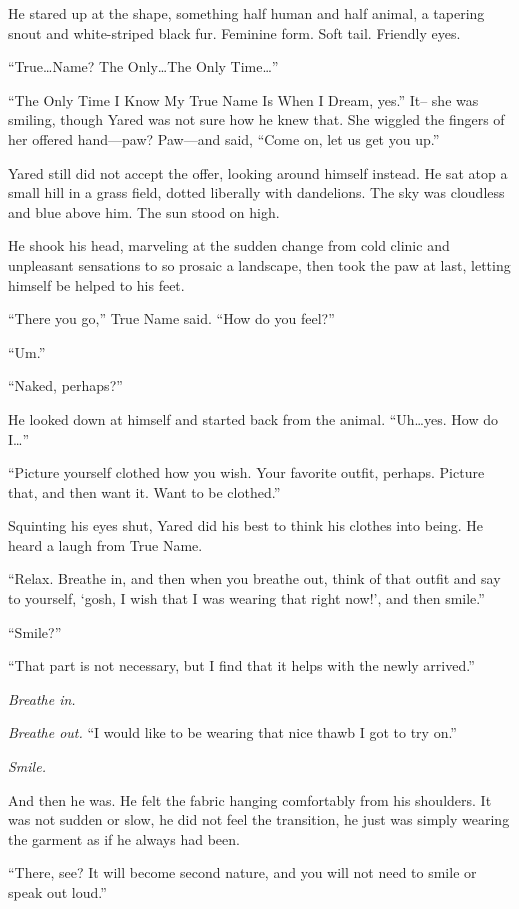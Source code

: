 He stared up at the shape, something half human and half animal, a tapering snout and white-striped black fur. Feminine form. Soft tail. Friendly eyes.

``True\ldots Name? The Only\ldots The Only Time\ldots{}''

``The Only Time I Know My True Name Is When I Dream, yes.'' It-- she was smiling, though Yared was not sure how he knew that. She wiggled the fingers of her offered hand---paw? Paw---and said, ``Come on, let us get you up.''

Yared still did not accept the offer, looking around himself instead. He sat atop a small hill in a grass field, dotted liberally with dandelions. The sky was cloudless and blue above him. The sun stood on high.

He shook his head, marveling at the sudden change from cold clinic and unpleasant sensations to so prosaic a landscape, then took the paw at last, letting himself be helped to his feet.

``There you go,'' True Name said. ``How do you feel?''

``Um.''

``Naked, perhaps?''

He looked down at himself and started back from the animal. ``Uh\ldots yes. How do I\ldots{}''

``Picture yourself clothed how you wish. Your favorite outfit, perhaps. Picture that, and then want it. Want to be clothed.''

Squinting his eyes shut, Yared did his best to think his clothes into being. He heard a laugh from True Name.

``Relax. Breathe in, and then when you breathe out, think of that outfit and say to yourself, `gosh, I wish that I was wearing that right now!', and then smile.''

``Smile?''

``That part is not necessary, but I find that it helps with the newly arrived.''

\emph{Breathe in.}

\emph{Breathe out.} ``I would like to be wearing that nice thawb I got to try on.''

\emph{Smile.}

And then he was. He felt the fabric hanging comfortably from his shoulders. It was not sudden or slow, he did not feel the transition, he just was simply wearing the garment as if he always had been.

``There, see? It will become second nature, and you will not need to smile or speak out loud.''

